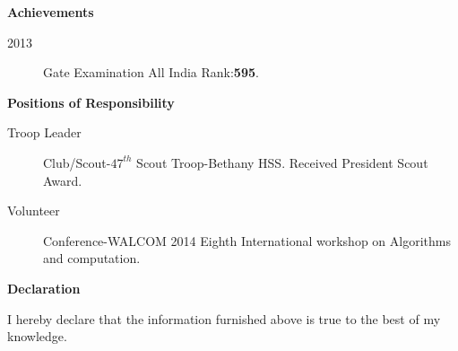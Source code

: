 \documentclass[A4paper,11pt]{article}
\newcommand{\resitem}[1]{\item #1 \vspace{-2pt}}
\newcommand{\resheading}[1]{{\large \colorbox{mygrey}{\begin{minipage}{\textwidth}{\textbf{#1 \vphantom{p\^{E}}}}\end{minipage}}}}
\begin{document}
\resheading{Achievements}
	\begin{description}
		\resitem[2013] Gate Examination All India Rank:\textbf{595}.
\end{description}

\resheading{Positions of Responsibility}
\begin{description}
\item[Troop Leader] Club/Scout-$47^{th}$ Scout Troop-Bethany HSS. Received President Scout Award. 
\item[Volunteer] Conference-WALCOM 2014 Eighth International workshop on Algorithms and computation.
\end{description}

\resheading{Declaration}
\begin{description}
\item{I hereby declare that the information furnished above is true to the best of my knowledge.}
\end{description}
\end{document}

